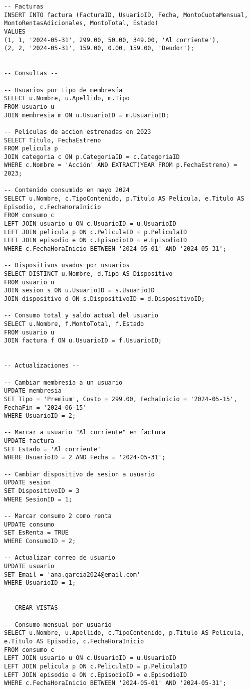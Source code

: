 \documentclass[12pt,a4paper]{article}
\begin{document}
\begin{lstlisting}
-- Facturas
INSERT INTO factura (FacturaID, UsuarioID, Fecha, MontoCuotaMensual, MontoRentasAdicionales, MontoTotal, Estado)
VALUES
(1, 1, '2024-05-31', 299.00, 50.00, 349.00, 'Al corriente'),
(2, 2, '2024-05-31', 159.00, 0.00, 159.00, 'Deudor');


-- Consultas --

-- Usuarios por tipo de membresía
SELECT u.Nombre, u.Apellido, m.Tipo
FROM usuario u
JOIN membresia m ON u.UsuarioID = m.UsuarioID;

-- Películas de accion estrenadas en 2023
SELECT Titulo, FechaEstreno
FROM pelicula p
JOIN categoria c ON p.CategoriaID = c.CategoriaID
WHERE c.Nombre = 'Acción' AND EXTRACT(YEAR FROM p.FechaEstreno) = 2023;

-- Contenido consumido en mayo 2024
SELECT u.Nombre, c.TipoContenido, p.Titulo AS Pelicula, e.Titulo AS Episodio, c.FechaHoraInicio
FROM consumo c
LEFT JOIN usuario u ON c.UsuarioID = u.UsuarioID
LEFT JOIN pelicula p ON c.PeliculaID = p.PeliculaID
LEFT JOIN episodio e ON c.EpisodioID = e.EpisodioID
WHERE c.FechaHoraInicio BETWEEN '2024-05-01' AND '2024-05-31';

-- Dispositivos usados por usuarios
SELECT DISTINCT u.Nombre, d.Tipo AS Dispositivo
FROM usuario u
JOIN sesion s ON u.UsuarioID = s.UsuarioID
JOIN dispositivo d ON s.DispositivoID = d.DispositivoID;

-- Consumo total y saldo actual del usuario
SELECT u.Nombre, f.MontoTotal, f.Estado
FROM usuario u
JOIN factura f ON u.UsuarioID = f.UsuarioID;


-- Actualizaciones --

-- Cambiar membresía a un usuario
UPDATE membresia
SET Tipo = 'Premium', Costo = 299.00, FechaInicio = '2024-05-15', FechaFin = '2024-06-15'
WHERE UsuarioID = 2;

-- Marcar a usuario "Al corriente" en factura
UPDATE factura
SET Estado = 'Al corriente'
WHERE UsuarioID = 2 AND Fecha = '2024-05-31';

-- Cambiar dispositivo de sesion a usuario
UPDATE sesion
SET DispositivoID = 3
WHERE SesionID = 1;

-- Marcar consumo 2 como renta
UPDATE consumo
SET EsRenta = TRUE
WHERE ConsumoID = 2;

-- Actualizar correo de usuario
UPDATE usuario
SET Email = 'ana.garcia2024@email.com'
WHERE UsuarioID = 1;


-- CREAR VISTAS --

-- Consumo mensual por usuario
SELECT u.Nombre, u.Apellido, c.TipoContenido, p.Titulo AS Pelicula, e.Titulo AS Episodio, c.FechaHoraInicio
FROM consumo c
LEFT JOIN usuario u ON c.UsuarioID = u.UsuarioID
LEFT JOIN pelicula p ON c.PeliculaID = p.PeliculaID
LEFT JOIN episodio e ON c.EpisodioID = e.EpisodioID
WHERE c.FechaHoraInicio BETWEEN '2024-05-01' AND '2024-05-31';


\end{lstlisting}
\end{document}

